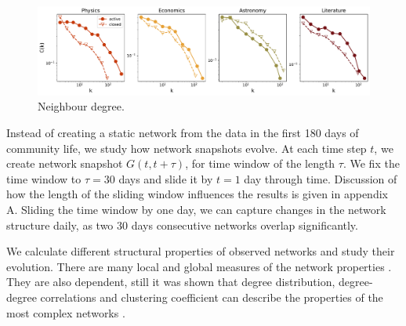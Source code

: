 \begin{figure}[h]
	\centering
	\includegraphics[width=\linewidth]{figures/stackexchange/clustering_fullnet.pdf}%
	\caption{Neighbour degree.}
	\label{fig:fullneighdeg}
\end{figure}




Instead of creating a static network from the data in the first 180 days of community life, we study how network snapshots evolve. At each time step $t$, we create network snapshot $G(t, t+\tau)$, for time window of the length $\tau$. We fix the time window to $\tau=30$ days and slide it by $t=1$ day through time. Discussion of how the length of the sliding window influences the results is given in appendix A. Sliding the time window by one day, we can capture changes in the network structure daily, as two 30 days consecutive networks overlap significantly. 

We calculate different structural properties of observed networks and study their evolution. There are many local and global measures of the network properties \cite{boccaletti2006complex}. They are also dependent, still it was shown that degree distribution, degree-degree correlations and clustering coefficient can describe the properties of the most complex networks \cite{orsini2015quantifying}. 






